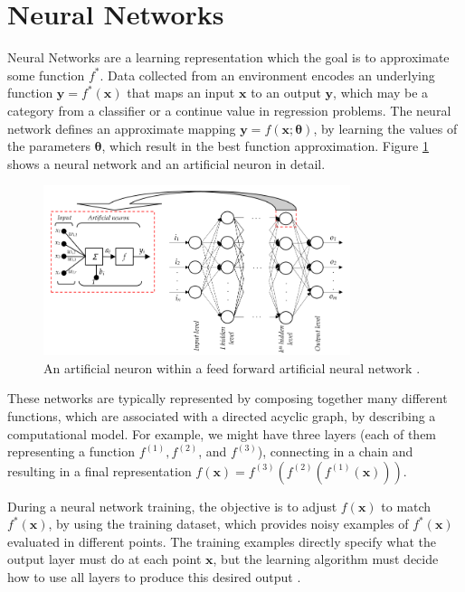 \section{Neural Networks}
\label{sec:neural_networks}
Neural Networks are a learning representation which the goal is to approximate some function \( f^* \). Data collected from an environment encodes an underlying function \( \mathrm{\mathbf{y}} = f^*(\mathrm{\mathbf{x}}) \) that maps an input \( \textbf{x} \) to an output \( \mathrm{\mathbf{y}} \), which may be a category from a classifier or a continue value in regression problems. The neural network defines an approximate mapping \( \mathrm{\mathbf{y}} = f(\mathrm{\mathbf{x}};\boldsymbol{\theta}) \), by learning the values of the parameters \(\boldsymbol{\theta}\), which result in the best function approximation. Figure \ref{fig:ann} shows a neural network and an artificial neuron in detail.

\begin{figure}[!htbp]
\centering
\includegraphics[width=0.8\textwidth]{Cap3/ann}
\caption{An artificial neuron within a feed forward artificial neural network \cite{dejan12}. }
\label{fig:ann}
\end{figure}

These networks are typically represented by composing together many different functions, which are associated with a directed acyclic graph, by describing a computational model. For example, we might have three layers (each of them representing a function \( f^{(1)}, f^{(2)} \), and \(f^{(3)} \)), connecting in a chain and resulting in a final representation \( f(\mathrm{\mathbf{x}}) = f^{(3)}(  f^{(2)} ( f^{(1)}(\mathrm{\mathbf{x}}))) \).

During a neural network training, the objective is to adjust \(f(\mathrm{\mathbf{x}})\) to match \(f^{*}(\mathrm{\mathbf{x}})\), by using the training dataset, which provides noisy examples of \(f^{*}(\mathrm{\mathbf{x}})\) evaluated in different points. The training examples directly specify what the output layer must do at each point \(\mathrm{\mathbf{x}}\), but the learning algorithm must decide how to use all layers to produce this desired output \cite{Goodfellow-et-al-2016}.

